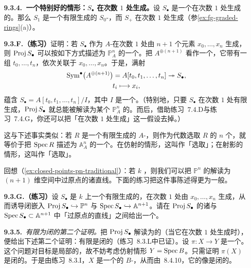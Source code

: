 \textbf{9.3.4.\ 一个特别好的情形：$S_\bullet$ 在次数 $1$ 处生成。}\quad 设 $S_\bullet$ 是一个在次数 $1$ 处生成的\trFinitelyGenerated\trGradedRing。那么 $S_1$ 是一个有限生成的 $S_0$-\trModule，而\trIrrelevantIdeal{} $S_+$ 在次数 $1$ 处生成（参\cref{ex:fg-graded-rings}(a)）。

\textbf{9.3.F.（练习）}\quad 证明：若 $S_\bullet$ 作为 $A$-\trAlgebra{}在次数 $1$ 处由 $n+1$ 个元素 $x_0,\dots,x_n$ 生成，则 $\operatorname{Proj} S_\bullet$ 可以按如下方式描述为 $\mathbb{P}^n_A$ 的一个\trClosedSubscheme。把 $A^{\oplus(n+1)}$ 看作一个\trFreeModule，它带有一组\trGenerator{} $t_0,\dots,t_n$，依次关联于 $x_0,\dots,x_n$。于是，满射
\[
\begin{gathered}
\operatorname{Sym}^{\bullet}\bigl(A^{\oplus(n+1)}\bigr)=A[t_0,t_1,\dots,t_n]\twoheadrightarrow S_\bullet,\\
t_i\longmapsto x_i,
\end{gathered}
\]
蕴含 $S_\bullet=A[t_0,t_1,\dots,t_n]/I$，其中 $I$ 是一个\trHomogeneous\trIdeal。（特别地，只要 $S_\bullet$ 在次数 $1$ 处有限生成，$\operatorname{Proj} S_\bullet$ 就总能被解读为某个 $\mathbb{P}^n_A$ 的\trClosedSubscheme。而后，借助\mbox{练习~7.4.D}与\mbox{练习~7.4.G}，你还可以把「在次数 $1$ 处生成」这一假设去掉。）

这与下述事实类似：若 $R$ 是一个有限生成的 $A$-\trAlgebra，则作为代数选取 $R$ 的 $n$ 个\trGenerator，就等价于把 $\operatorname{Spec} R$ 描述为 $\mathbb{A}^n_A$ 的一个\trClosedSubscheme。在仿射的情形，这叫作「选取\trCoordinate」；在射影的情形，这叫作「选取\trProjective\trCoordinate」。

回想（\cref{ex:closed-points-pn-traditional}）：若 $k$ \trAlgClosed，则我们可以把 $\mathbb{P}^n$ 的\trClosedPoint{}解读为 $(n+1)$ 维空间中过原点的诸直线。下面的练习把这件事陈述得更为一般。

\textbf{9.3.G.（练习）}\quad 设 $S_\bullet$ 是\trAlgClosedField{} $k$ 上一个有限生成的\trGradedRing，在次数 $1$ 处由 $x_0,\dots,x_n$ 生成，从而诱导闭嵌入 $\operatorname{Proj} S_\bullet\hookrightarrow\mathbb{P}^n$ 与 $\operatorname{Spec} S_\bullet\hookrightarrow\mathbb{A}^{n+1}$。请在 $\operatorname{Proj} S_\bullet$ 的诸\trClosedPoint{}与 $\operatorname{Spec} S_\bullet\subset\mathbb{A}^{n+1}$ 中「过原点的直线」之间给出一个\trBijection。

\textbf{9.3.5.}\ \emph{有限\trMorphism{}为闭的第二个证明。}\quad 把 $\operatorname{Proj} S_\bullet$ 解读为\trProjectiveSpace{}的\trClosedSubscheme（当它在次数 $1$ 处生成时），便给出下述第二个证明：有限\trMorphism{}是闭的（\mbox{练习~8.3.L}中已证）。设 $\pi\colon X\to Y$ 是一个\trFinite\trMorphism。这个问题对目标是局部的，故不妨考虑仿射情形 $Y=\operatorname{Spec} B$。只需证明 $\pi(X)$ 是闭的。于是由\mbox{练习~8.3.I}，$X$ 是一个\trProjective{}的 $B$-\trScheme，从而由\trFundamentalTheoremOfEliminationTheory{}~8.4.10，它的像是闭的。

